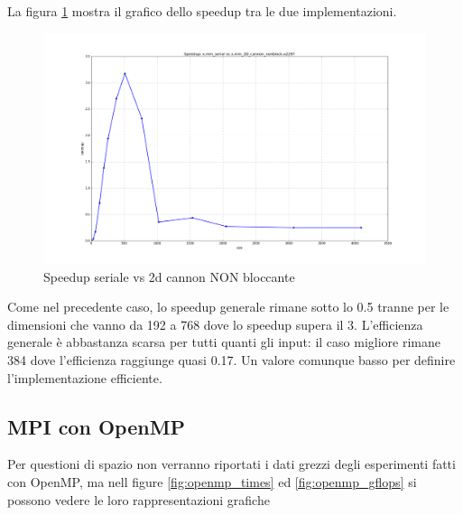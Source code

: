 La figura \ref{fig:speedup_serial_2d_cannon_nonblock} mostra il grafico dello speedup tra le due implementazioni.

\begin{figure}[htbp]
    \begin{center}
        \includegraphics[width=15cm]{immagini/speedup_serial_2d_cannon_nonblock.png}
    \end{center}
    \caption{Speedup seriale vs 2d cannon NON bloccante}
    \label{fig:speedup_serial_2d_cannon_nonblock}
\end{figure}

Come nel precedente caso, lo speedup generale rimane sotto lo 0.5 tranne per le dimensioni che vanno da 192 a 768 dove lo speedup supera il 3. L'efficienza generale \`{e} abbastanza scarsa per tutti quanti gli input: il caso migliore rimane 384 dove l'efficienza raggiunge quasi 0.17. Un valore comunque basso per definire l'implementazione efficiente.

\subsection{MPI con OpenMP}

Per questioni di spazio non verranno riportati i dati grezzi degli esperimenti fatti con OpenMP, ma nell figure \ref{fig:openmp_times} ed \ref{fig:openmp_gflops} si possono vedere le loro rappresentazioni grafiche

